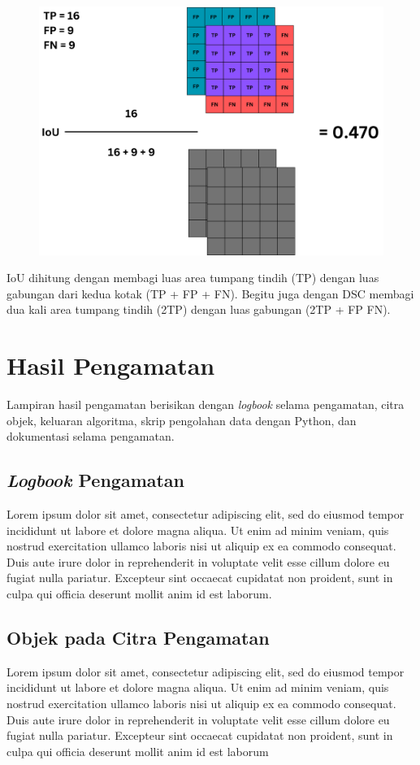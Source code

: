   \begin{figure}[H]
 	\centering
 	\includegraphics[scale=.3]{gambar/lampiran/IoU.png}
 \end{figure} 
 
 IoU dihitung dengan membagi luas area tumpang tindih (TP) dengan luas gabungan dari kedua kotak (TP + FP + FN). Begitu juga dengan DSC membagi dua kali area tumpang tindih (2TP) dengan luas gabungan (2TP + FP FN). 
 

\chapter{Hasil Pengamatan} \label{lampiranD}
\noindent Lampiran hasil pengamatan berisikan dengan \textit{logbook} selama pengamatan, citra objek, keluaran algoritma, skrip pengolahan data dengan Python, dan dokumentasi selama pengamatan.
    \section{\textit{Logbook} Pengamatan}
     \noindent Lorem ipsum dolor sit amet, consectetur adipiscing elit, sed do eiusmod tempor incididunt ut labore et dolore magna aliqua. Ut enim ad minim veniam, quis nostrud exercitation ullamco laboris nisi ut aliquip ex ea commodo consequat. Duis aute irure dolor in reprehenderit in voluptate velit esse cillum dolore eu fugiat nulla pariatur. Excepteur sint occaecat cupidatat non proident, sunt in culpa qui officia deserunt mollit anim id est laborum.
    \section{Objek pada Citra Pengamatan}
    \noindent Lorem ipsum dolor sit amet, consectetur adipiscing elit, sed do eiusmod tempor incididunt ut labore et dolore magna aliqua. Ut enim ad minim veniam, quis nostrud exercitation ullamco laboris nisi ut aliquip ex ea commodo consequat. Duis aute irure dolor in reprehenderit in voluptate velit esse cillum dolore eu fugiat nulla pariatur. Excepteur sint occaecat cupidatat non proident, sunt in culpa qui officia deserunt mollit anim id est laborum

